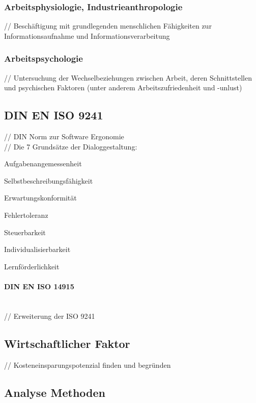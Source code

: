 \documentclass[12pt,a4paper,bibliography=totocnumbered,listof=totocnumbered]{scrartcl}
\begin{document}
\subsubsection{Arbeitsphysiologie, Industrieanthropologie}
// Beschäftigung mit grundlegenden menschlichen Fähigkeiten zur Informationsaufnahme und Informationsverarbeitung\\

\subsubsection{Arbeitspsychologie}
// Untersuchung der Wechselbeziehungen zwischen Arbeit, deren Schnittstellen und psychischen Faktoren (unter anderem Arbeitszufriedenheit und -unlust)\\

\subsection{DIN EN ISO 9241}
// DIN Norm zur Software Ergonomie\\
// Die 7 Grundsätze der Dialoggestaltung:
\begin{compactitem}
	\item Aufgabenangemessenheit
	\item Selbstbeschreibungsfähigkeit
	\item Erwartungskonformität
	\item Fehlertoleranz
	\item Steuerbarkeit
	\item Individualisierbarkeit
	\item Lernförderlichkeit
\end{compactitem}
\paragraph{DIN EN ISO 14915}
$\;$ \\
// Erweiterung der ISO 9241\\

\subsection{Wirtschaftlicher Faktor}
// Kosteneinsparungspotenzial finden und begründen\\

\subsection{Analyse Methoden}
\end{document}
